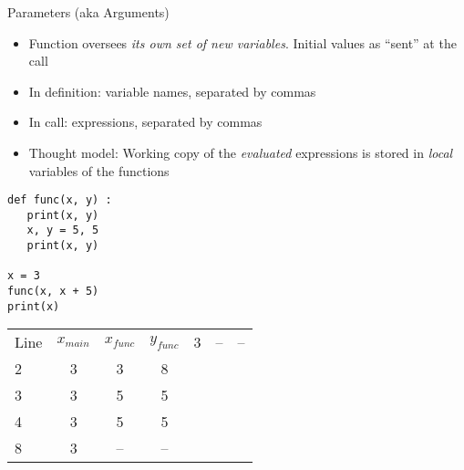 
\begin{frame}[fragile]{Parameters (aka Arguments)}
%
\begin{itemize}
\item Function oversees \emph{its own set of new variables}. Initial values as \enquote{sent} at the call
\item In definition: variable names, separated by commas
\item In call: expressions, separated by commas
\item Thought model: Working copy of the \emph{evaluated} expressions is stored in \emph{local} variables of the functions
\end{itemize}
%
\begin{tcbraster}[raster columns=2,
                  raster equal height,
                  nobeforeafter,
                  raster column skip=0.5cm]
\begin{codebox}
\begin{verbatim}
def func(x, y) :
   print(x, y)
   x, y = 5, 5
   print(x, y)

x = 3
func(x, x + 5)
print(x)   
\end{verbatim}
\end{codebox}
%
\begin{tcolorbox}[title=Evolution of Values]
\scriptsize
\begin{center}
\begin{tabular}{l|ccc}
Line & $x_{main}$ & $x_{func}$ & $y_{func}$  & 3 & -- & -- \\
2 & 3 &  3 &  8 \\
3 & 3 &  5 &  5 \\
4 & 3 &  5 &  5 \\
8 & 3 & -- & --
\end{tabular}
\end{center}
\end{tcolorbox}
\end{tcbraster}
%
\end{frame}


